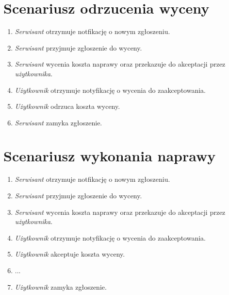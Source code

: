 \documentclass[11pt,a4paper]{article}
\begin{document}
\section{Scenariusz odrzucenia wyceny}
\begin{enumerate}
\item{\textit{Serwisant} otrzymuje notfikację o nowym zgłoszeniu.}
\item{\textit{Serwisant} przyjmuje zgłoszenie do wyceny.}
\item{\textit{Serwisant} wycenia koszta naprawy oraz przekazuje do akceptacji przez \textit{użytkownika}.}
\item{\textit{Użytkownik} otrzymuje notyfikację o wycenia do zaakceptowania.}
\item{\textit{Użytkownik} odrzuca koszta wyceny.}
\item{\textit{Serwisant} zamyka zgłoszenie.}
\end{enumerate}

\section{Scenariusz wykonania naprawy}
\begin{enumerate}
\item{\textit{Serwisant} otrzymuje notfikację o nowym zgłoszeniu.}
\item{\textit{Serwisant} przyjmuje zgłoszenie do wyceny.}
\item{\textit{Serwisant} wycenia koszta naprawy oraz przekazuje do akceptacji przez \textit{użytkownika}.}
\item{\textit{Użytkownik} otrzymuje notyfikację o wycenia do zaakceptowania.}
\item{\textit{Użytkownik} akceptuje koszta wyceny.}
\item{...}
\item{\textit{Użytkownik} zamyka zgłoszenie.}
\end{enumerate}
\end{document}
